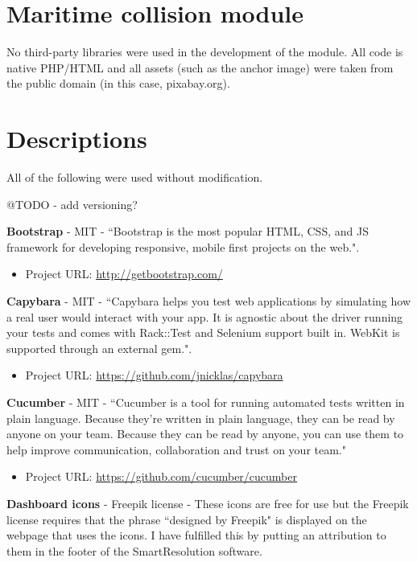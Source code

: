\section{Maritime collision module}

No third-party libraries were used in the development of the module. All code is native PHP/HTML and all assets (such as the anchor image) were taken from the public domain (in this case, pixabay.org).

\section{Descriptions}

All of the following were used without modification.

@TODO - add versioning?

\textbf{Bootstrap} - MIT - ``Bootstrap is the most popular HTML, CSS, and JS framework for developing responsive, mobile first projects on the web.".

\begin{itemize}
\item Project URL: \url{http://getbootstrap.com/}
\end{itemize}

\textbf{Capybara} - MIT - ``Capybara helps you test web applications by simulating how a real user would interact with your app. It is agnostic about the driver running your tests and comes with Rack::Test and Selenium support built in. WebKit is supported through an external gem.". 

\begin{itemize}
\item Project URL: \url{https://github.com/jnicklas/capybara}
\end{itemize}

\textbf{Cucumber} - MIT - ``Cucumber is a tool for running automated tests written in plain language. Because they're written in plain language, they can be read by anyone on your team. Because they can be read by anyone, you can use them to help improve communication, collaboration and trust on your team."

\begin{itemize}
\item Project URL: \url{https://github.com/cucumber/cucumber}
\end{itemize}

\textbf{Dashboard icons} - Freepik license - These icons are free for use but the Freepik license requires that the phrase ``designed by Freepik" is displayed on the webpage that uses the icons. I have fulfilled this by putting an attribution to them in the footer of the SmartResolution software.

